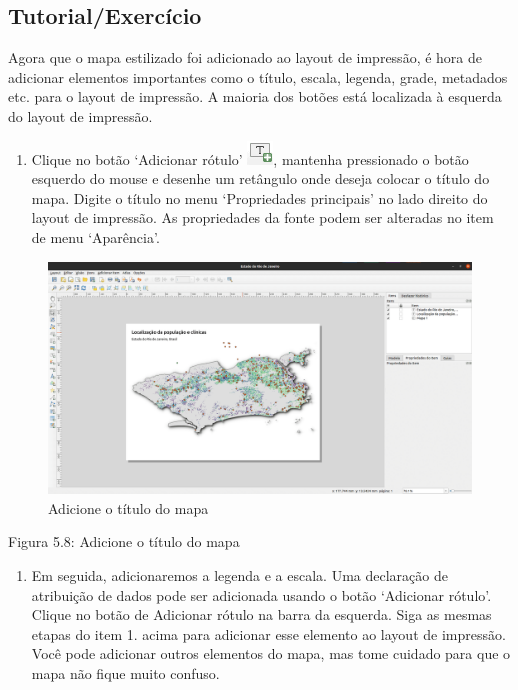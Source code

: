 \documentclass[
]{krantz}
\providecommand{\tightlist}{%
  \setlength{\itemsep}{0pt}\setlength{\parskip}{0pt}}
\begin{document}
\hypertarget{tutorialexercuxedcio-2}{%
\subsection{Tutorial/Exercício}\label{tutorialexercuxedcio-2}}

Agora que o mapa estilizado foi adicionado ao layout de impressão, é hora de adicionar elementos importantes como o título, escala, legenda, grade, metadados etc. para o layout de impressão. A maioria dos botões está localizada à esquerda do layout de impressão.

\begin{enumerate}
\def\labelenumi{\arabic{enumi}.}
\tightlist
\item
  Clique no botão `Adicionar rótulo' \includegraphics{media/modulo5/add_title.png}, mantenha pressionado o botão esquerdo do mouse e desenhe um retângulo onde deseja colocar o título do mapa. Digite o título no menu `Propriedades principais' no lado direito do layout de impressão. As propriedades da fonte podem ser alteradas no item de menu `Aparência'.
\end{enumerate}

\begin{figure}
\centering
\includegraphics{media/modulo5/print-layout-with-title.png}
\caption{Adicione o título do mapa}
\end{figure}

Figura 5.8: Adicione o título do mapa

\begin{enumerate}
\def\labelenumi{\arabic{enumi}.}
\setcounter{enumi}{1}
\tightlist
\item
  Em seguida, adicionaremos a legenda e a escala. Uma declaração de atribuição de dados pode ser adicionada usando o botão `Adicionar rótulo'. Clique no botão de Adicionar rótulo na barra da esquerda. Siga as mesmas etapas do item 1. acima para adicionar esse elemento ao layout de impressão. Você pode adicionar outros elementos do mapa, mas tome cuidado para que o mapa não fique muito confuso.
\end{enumerate}
\end{document}
